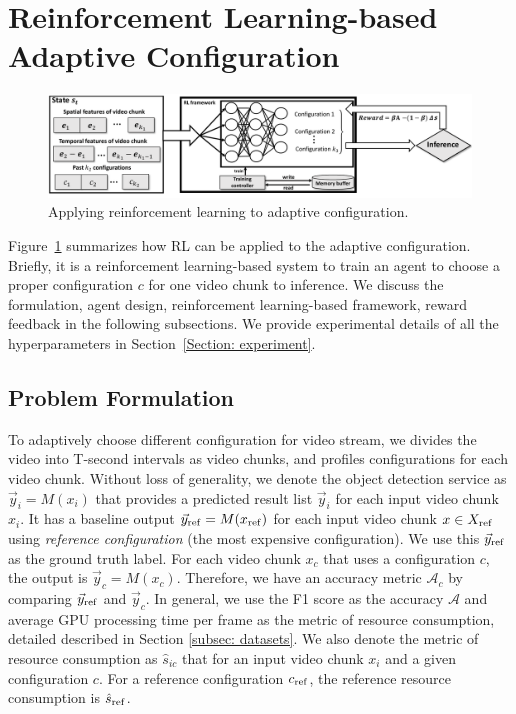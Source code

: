 \section{Reinforcement Learning-based Adaptive Configuration}
\label{Section: design}

\begin{figure}[!t]
	\centerline{\includegraphics[width=0.9\linewidth]{figures/framework2.pdf}}
	\caption{Applying reinforcement learning to adaptive configuration.}
	\label{fig: DQN}
	\vspace{-0.5cm}
\end{figure}

Figure~\ref{fig: DQN} summarizes how RL can be applied to the adaptive configuration. Briefly, it is a reinforcement learning-based system to train an agent to choose a proper configuration $ c $ for one video chunk to inference. We discuss the formulation, agent design, reinforcement learning-based framework, reward feedback in the following subsections. We provide experimental details of all the hyperparameters in Section~\ref{Section: experiment}. %

\subsection{Problem Formulation}
\label{subsec: formulation}

To adaptively choose different configuration for video stream, we divides the video into T-second intervals as video chunks, and profiles configurations for each video chunk. Without loss of generality, we denote the object detection service as $ \vec{y}_i = M(x_i) $ that provides a predicted result list $ \vec{y}_i $ for each input video chunk $ x_i $. It has a baseline output $ \vec{y}_{\rm ref} = M(x_{\rm ref}) $ for each input video chunk $ x \in X_{\rm ref} $ using \emph{reference configuration} (the most expensive configuration). We use this $ \vec{y}_{\rm ref} $ as the ground truth label. For each video chunk $ x_c $ that uses a configuration $ c $, the output is $ \vec{y}_c = M(x_c) $. Therefore, we have an accuracy metric $ \mathcal{A}_c $ by comparing $ \vec{y}_{\rm ref} $ and $ \vec{y}_c $. In general, we use the F1 score as the accuracy $ \mathcal{A} $ and average GPU processing time per frame as the metric of resource consumption, detailed described in Section \ref{subsec: datasets}. We also denote the metric of resource consumption as $ \hat{s}_{ic} $ that for an input video chunk $ x_i $ and a given configuration $ c $. For a reference configuration $ c_{\rm ref} $, the reference resource consumption is $ \hat{s}_{\rm ref} $.

